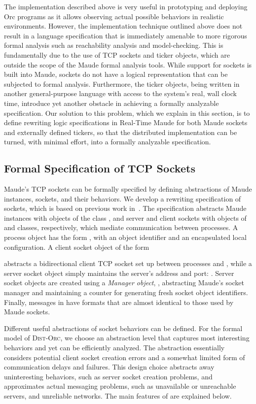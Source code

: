 \documentclass{eptcs}
\begin{document}
The implementation described above is very useful in prototyping and deploying Orc programs as it allows observing actual possible behaviors in realistic environments. However, the implementation technique outlined above does not result in a language specification that is immediately amenable to more rigorous formal analysis such as reachability analysis and model-checking. This is fundamentally due to the use of TCP sockets and ticker objects, which are outside the scope of the Maude formal analysis tools. While support for sockets is built into Maude, sockets do not have a logical representation that can be subjected to formal analysis. Furthermore, the ticker objects, being written in another general-purpose language with access to the system's real, wall clock time, introduce yet another obstacle in achieving a formally analyzable specification. Our solution to this problem, which we explain in this section, is to define rewriting logic specifications in Real-Time Maude for both Maude sockets and externally defined tickers, so that the distributed implementation can be turned, with minimal effort, into a formally analyzable specification. 


\subsection{Formal Specification of TCP Sockets}

Maude's TCP sockets can be formally specified by defining abstractions of Maude instances, sockets, and their behaviors. We develop a rewriting specification  of sockets, which is based on previous work in~\cite{DuranRV07,RiescoV07}. 
The specification abstracts Maude instances with objects of the class , and server and client sockets with objects of  and  classes, respectively, which  mediate communication between processes. A process object has the form , with  an object identifier and  an encapsulated local configuration. A client socket object of the form 

abstracts a bidirectional client TCP socket set up between processes  and , while a server socket object simply maintains the server's address and port: .
Server socket objects are created using a \emph{Manager object}, , abstracting Maude's socket manager and maintaining a counter for generating fresh socket object identifiers. Finally, messages in  have formats that are almost identical to those used by Maude sockets.

Different useful abstractions of socket behaviors can be defined. For the formal model of \textsc{Dist-Orc}, we choose an abstraction level that captures most interesting behaviors and yet can be efficiently analyzed. The abstraction essentially considers potential client socket creation errors and a somewhat limited form of communication delays and failures. This design choice abstracts away uninteresting behaviors, such as server socket creation problems, and approximates actual messaging problems, such as unavailable or unreachable servers, and unreliable networks. The main features of  are explained below.
\end{document}

